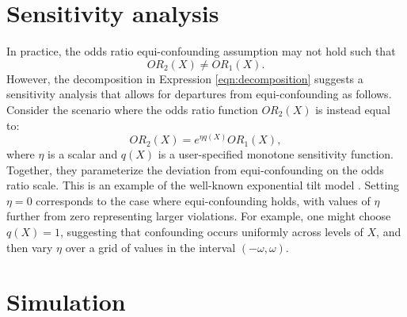 \documentclass[11pt]{article}
\begin{document}
\section*{Sensitivity analysis}
In practice, the odds ratio equi-confounding assumption may not hold such that
$$OR_2(X) \neq OR_1(X).$$ 
However, the decomposition in Expression \ref{eqn:decomposition} suggests a sensitivity analysis that allows for departures from equi-confounding as follows. Consider the scenario where the odds ratio function $OR_2(X)$ is instead equal to:
\begin{equation}\label{eq:sensitivity-analysis}OR_2(X) = e^{\eta q(X)} OR_1(X), \end{equation}
where $\eta$ is a scalar and $q(X)$ is a user-specified  monotone sensitivity function. Together, they parameterize the deviation from equi-confounding on the odds ratio scale. This is an example of the well-known exponential tilt model \cite{scharfstein_adjusting_1999, liu_identification_2020}. Setting $\eta = 0$ corresponds to the case where equi-confounding holds, with values of $\eta$ further from zero representing larger violations. For example, one might choose $q(X) = 1$, suggesting that confounding occurs uniformly across levels of $X$, and then vary $\eta$ over a grid of values in the interval $(-\omega, \omega)$.



\section*{Simulation}
\end{document}
